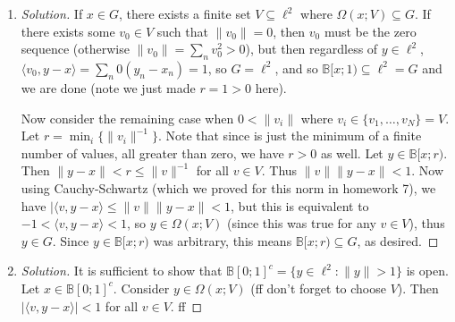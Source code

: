 \documentclass{article}
\begin{document}
\begin{enumerate}
\begin{proof}[Solution]
		Since $0 \in U$, there exists a finite set $V\subseteq \ell^2$
		such that $\Omega(0;V) \subseteq U$.
		If $V = \emptyset$, then $\Omega(0;V) = \ell^3$
		since $-1 < \langle v, y-x \rangle < 1$ is now
		vacuously true for all $y \in \ell^2$;
		then $\Omega(0;V) \cap S$ since $\hat{\mathbf{e}}_1 \in \ell^2 \cap S$,
		and since $\Omega(0;V) \subseteq U$, $U \cap S \neq \emptyset$.
		So now assume $V$ is not empty.
		Denote the elements of $V$ as $v^{i}$ where $1 \leq i \leq k$.
		Then since $v^i \in \ell^2$,
		we must have that $\lim_n (v^i_n)^2 = 0$ (crude divergence test).
		Then there exists some $N_i$ where $(v^i_{N_i})^2 < 1$ by the definition of convergence.
		Let $N = \min_i\{N_i\}$.
		Then $-1 < v^i_N < 1$ as well.
		See
		\[
			\langle v^i, \hat{\mathbf{e}}_N \rangle =
			\sum_{n=1}^\infty v^i_n (\hat{\mathbf{e}}_N)_n
			= v^i_N
		\]
		Thus $\hat{\mathbf{e}}_N \in \Omega(0,V)$ since
		$-1 < \langle v, \hat{\mathbf{e}}_N - 0 \rangle = v_N < 1$
		for all $v \in V$.
		Thus, $\hat{\mathbf{e}}_N \in \Omega(0,V) \subseteq U$.
		Since $\hat{\mathbf{e}}_N \in S$,
		thus shows that $S \cap U \neq \emptyset$,
		so we are done since $U$ was arbitrary
		(this works for any open $U \in \mathcal{N}(0)$).
	\end{proof}
	\item \begin{proof}[Solution]\let\qed\relax
		If $x \in G$, there exists a finite set $V \subseteq \ell^2$
		where $\Omega(x;V) \subseteq G$.
		If there exists some $v_0 \in V$ such that $\lVert v_0 \rVert =0$,
		then $v_0$ must be the zero sequence
		(otherwise $\lVert v_0 \rVert = \sum_n v_0^2 > 0$),
		but then regardless of $y \in \ell^2$,
		$\langle v_0, y-x\rangle = \sum_n 0(y_n-x_n) = 1$,
		so $G = \ell^2$, and so $\mathbb{B}[x;1) \subseteq \ell^2 = G$
		and we are done (note we just made $r=1>0$ here).

		Now consider the remaining case when $0 < \lVert v_i \rVert$
		where $v_i \in \{v_1, \dots, v_N\} = V$.
		Let $r = \min_i\{\lVert v_i \rVert^{-1}\}$.
		Note that since is just the minimum of a finite number of values,
		all greater than zero, we have $r > 0$ as well.
		Let $y \in \mathbb{B}[x;r)$.
		Then $\lVert y - x \rVert < r \leq \lVert v \rVert^{-1}$ for all $v \in V$.
		Thus $\lVert v \rVert\lVert y - x \rVert < 1$.
		Now using Cauchy-Schwartz (which we proved for this norm in homework 7),
		we have $|\langle v, y-x \rangle \leq \lVert v \rVert\lVert y - x \rVert < 1$,
		but this is equivalent to $-1 < \langle v, y-x \rangle < 1$,
		so $y \in \Omega(x;V)$ (since this was true for any $v \in V$),
		thus $y \in G$.
		Since $y \in \mathbb{B}[x;r)$ was arbitrary,
		this means $\mathbb{B}[x;r) \subseteq G$,
		as desired.
	\end{proof}
	\item \begin{proof}[Solution]\let\qed\relax
		It is sufficient to show that $\mathbb{B}[0;1]^c
		= \{y \in \ell^2 \colon \lVert y \rVert > 1\}$ is open.
		Let $x \in \mathbb{B}[0;1]^c$.
		Consider $y \in \Omega(x;V)$ (ff don't forget to choose $V$).
		Then $|\langle v, y-x \rangle| < 1$ for all $v \in V$.
		ff


\end{proof}
\end{enumerate}
\end{document}
